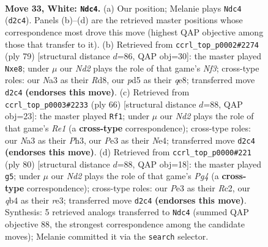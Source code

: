 \documentclass[11pt]{article}
\begin{document}
\clearpage

\begin{figure}[p]\centering
\begin{subfigure}{0.46\textwidth}\centering
\resizebox{\linewidth}{!}{%
\newchessgame
\chessboard[
  setfen={r3r3/1pp3kp/5p2/3p1bb1/1q1K4/N3P3/P2N1P2/R7 w - - 0 33},
  showmover=false,
  pgfstyle=straightmove, color=movearrow, markmove={d2-c4}
]}
\caption{}
\end{subfigure}\hfill
\begin{subfigure}{0.46\textwidth}\centering
\resizebox{\linewidth}{!}{%
\newchessgame
\chessboard[
  setfen={3rQ3/1p4pk/p4n1p/2P2p2/3n4/P2B2B1/1P4PP/5RK1 b - - 0 40},
  showmover=false,
  pgfstyle=straightmove, color=movearrow, markmove={f6-e8}
]}
\caption{}
\end{subfigure}
\\[4pt]
\begin{subfigure}{0.46\textwidth}\centering
\resizebox{\linewidth}{!}{%
\newchessgame
\chessboard[
  setfen={5k2/1R6/2p1r1pp/5bp1/3rN3/5P1P/P5P1/4R1K1 w - - 1 34},
  showmover=false,
  pgfstyle=straightmove, color=movearrow, markmove={e1-f1}
]}
\caption{}
\end{subfigure}\hfill
\begin{subfigure}{0.46\textwidth}\centering
\resizebox{\linewidth}{!}{%
\newchessgame
\chessboard[
  setfen={8/3rbpkp/6p1/1Rp1p3/2P1N1PP/4rP2/2R3K1/8 w - - 0 41},
  showmover=false,
  pgfstyle=straightmove, color=movearrow, markmove={g4-g5}
]}
\caption{}
\end{subfigure}
\caption{\textbf{Move 33, White: \texttt{Ndc4}.} (a) Our position; Melanie plays \texttt{Ndc4} (\texttt{d2c4}). Panels (b)--(d) are the retrieved master positions whose correspondence most drove this move (highest QAP objective among those that transfer to it). (b) Retrieved from \texttt{ccrl\_top\_p0002\#2274} (ply 79) [structural distance $d$=86, QAP obj=30]: the master played \texttt{Nxe8}; under $\mu$ our \emph{Nd2} plays the role of that game's \emph{Nf3}; cross-type roles: our \emph{N}a3 as their \emph{R}d8, our \emph{p}d5 as their \emph{q}e8; transferred move \texttt{d2c4} \textbf{(endorses this move)}. (c) Retrieved from \texttt{ccrl\_top\_p0003\#2233} (ply 66) [structural distance $d$=88, QAP obj=23]: the master played \texttt{Rf1}; under $\mu$ our \emph{Nd2} plays the role of that game's \emph{Re1} (a \textbf{cross-type} correspondence); cross-type roles: our \emph{N}a3 as their \emph{P}h3, our \emph{P}e3 as their \emph{N}e4; transferred move \texttt{d2c4} \textbf{(endorses this move)}. (d) Retrieved from \texttt{ccrl\_top\_p0000\#221} (ply 80) [structural distance $d$=88, QAP obj=18]: the master played \texttt{g5}; under $\mu$ our \emph{Nd2} plays the role of that game's \emph{Pg4} (a \textbf{cross-type} correspondence); cross-type roles: our \emph{P}e3 as their \emph{R}c2, our \emph{q}b4 as their \emph{r}e3; transferred move \texttt{d2c4} \textbf{(endorses this move)}. Synthesis: 5 retrieved analogs transferred to \texttt{Ndc4} (summed QAP objective 88, the strongest correspondence among the candidate moves); Melanie committed it via the \texttt{search} selector.}
\label{fig:thought-m64}
\end{figure}
\end{document}
